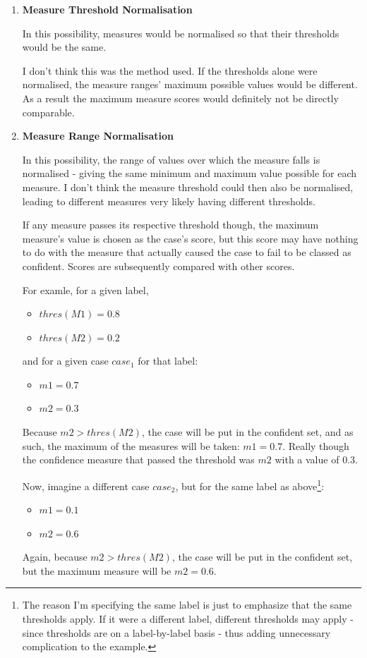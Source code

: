 \documentclass[a4paper,11pt]{report}
\begin{document}
\begin{enumerate}
	\item \textbf{Measure Threshold Normalisation}
	
	In this possibility, measures would be normalised so that their thresholds would be the same.
	
	I don't think this was the method used. If the thresholds alone were normalised, the measure ranges' maximum possible values would be different. As a result the maximum measure scores would definitely not be directly comparable.
	
	\item \textbf{Measure Range Normalisation}
	
	In this possibility, the range of values over which the measure falls is normalised - giving the same minimum and maximum value possible for each measure. I don't think the measure threshold could then also be normalised, leading to different measures very likely having different thresholds. 
	
	If any measure passes its respective threshold though, the maximum measure's value is chosen as the case's score, but this score may have nothing to do with the measure that actually caused the case to fail to be classed as confident. Scores are subsequently compared with other scores.
	
	\begin{samepage}
	For examle, for a given label, 
	\begin{itemize}
		\item $thres(M1) = 0.8$
		\item $thres(M2) = 0.2$
	\end{itemize}
	and for a given case $case_{1}$ for that label:
	\begin{itemize}
		\item $m1 = 0.7$
		\item $m2 = 0.3$
	\end{itemize}  
	\end{samepage}
	Because $m2 > thres(M2)$, the case will be put in the confident set, and as such, the maximum of the measures will be taken: $m1=0.7$. Really though the confidence measure that passed the threshold was $m2$ with a value of $0.3$.
	
	Now, imagine a different case $case_{2}$, but for the same label as above\footnote{The reason I'm specifying the same label is just to emphasize that the same thresholds apply. If it were a different label, different thresholds may apply - since thresholds are on a label-by-label basis - thus adding unnecessary complication to the example.}:
	\begin{itemize}
		\item $m1 = 0.1$
		\item $m2 = 0.6$
	\end{itemize}
	Again, because $m2 > thres(M2)$, the case will be put in the confident set, but the maximum measure will be $m2 = 0.6$. 
	

\end{enumerate}
\end{document}
